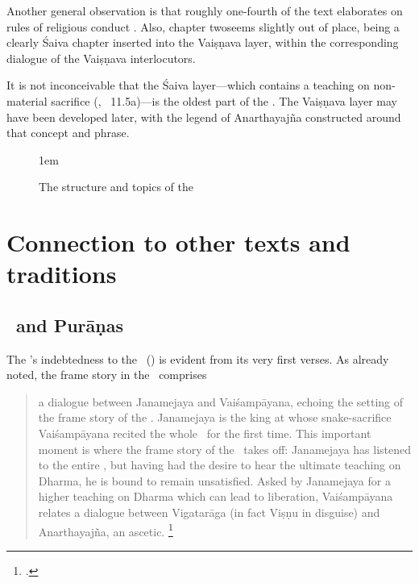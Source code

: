 Another general observation is that roughly one-fourth 
of the text elaborates on rules of religious conduct
. Also, chapter two\linebreak seems slightly
out of place, being a clearly Śaiva chapter inserted
into the Vaiṣṇava layer, within the corresponding 
dialogue of the Vai\-ṣṇa\-va interlocutors.

It is not inconceivable that the Śaiva layer---which
contains a teaching on non-material sacrifice
(, \VSS\ 11.5a)---is
the oldest part of the \VSS. The Vaiṣṇava layer may have 
been developed later, with the legend of Anarthayajña
constructed around that concept and phrase.



\begin{figure}[p]

\begin{center}
\vspace{0em}
\leftskip1em
\end{center}

\caption[Structure and topics of the \VSS]{The structure and topics of the \VSS\ 
   \label{fig:structlotus}}
   
\end{figure}



\section{Connection to other texts and traditions}
\label{vss_connection_other_texts}
\subsection{\MBh\ and Purāṇas} 

The \VSS's indebtedness to the \MBh\ (\MBH) is evident 
from its very first verses. As already noted,
the frame story in the \VSS\ comprises

\begin{quote}
a dialogue between Janamejaya and Vaiśampāyana, 
echoing the setting of the frame story of the \MBh. 
Janamejaya is the king at whose snake-sacrifice 
Vaiśampāyana recited the whole \MBh\ for the first
time. This important moment is where the frame story 
of the \Vss\ takes off: Janamejaya has 
listened to the entire \MBh,
but having had the desire to hear the ultimate 
teaching on Dharma, he is bound to remain unsatisfied.
Asked by Janamejaya for a higher teaching
on Dharma which can lead to liberation, 
Vaiśampāyana relates a dialogue between Vigatarāga 
(in fact Viṣṇu in disguise) and Anarthayajña, an ascetic.%
				\footnote{.}
\end{quote}
 
